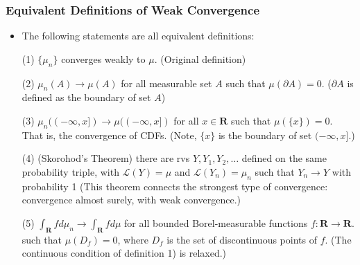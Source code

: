 \documentclass[handout]{beamer}
\begin{document}
\frame
{
  \frametitle{Equivalent Definitions of Weak Convergence} 

   \begin{itemize}

               \item<1->[] \begin{Theorem} The following statements are all equivalent definitions:

               (1) $\{\mu_n\}$ converges weakly to $\mu$. (Original definition) 
               \vspace{2mm}
               
                 {\color{blue} (2) $\mu_n(A)\rightarrow \mu(A)$ for all measurable set $A$ such that $\mu(\partial A)=0$. ($\partial A$ is defined as the boundary of set $A$) }
                              \vspace{2mm}

               (3) $\mu_n((-\infty, x])\rightarrow \mu((-\infty, x])$ for all $x\in \mathbf{R}$ such that $\mu(\{x\})=0$. That is, the convergence of CDFs. (Note, $\{x\}$ is the boundary of set $(-\infty, x]$.)
                              \vspace{2mm}

                 {\color{blue}  (4) (Skorohod's Theorem) there are rvs $Y, Y_1, Y_2, \ldots$ defined on the same probability triple, with $\mathcal{L} (Y)=\mu$ and $\mathcal{L} (Y_n)=\mu_n $ such that $Y_n\rightarrow Y$ with probability 1 (This theorem connects the strongest type of convergence: convergence almost surely, with weak convergence.) }
                              \vspace{2mm}

               (5) $\int_{\mathbf{R}}f d\mu_n \rightarrow \int_{\mathbf{R}}f d\mu$ for all bounded Borel-measurable functions $f:\mathbf{R}\rightarrow \mathbf{R}$. such that $\mu(D_f)=0$, where $D_f$ is the set of discontinuous points of $f$. (The continuous condition of definition 1) is relaxed.)
              
                            \end{Theorem}

                                               \end{itemize}
}
\end{document}
